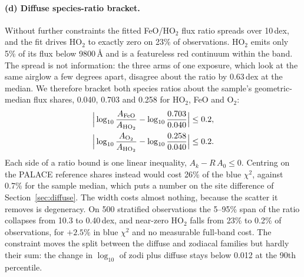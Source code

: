\paragraph{(d) Diffuse species-ratio bracket.} Without further constraints
the fitted FeO/HO$_2$ flux ratio spreads over 10\,dex, and the fit drives
HO$_2$ to exactly zero on 23\% of observations. HO$_2$ emits only 5\% of its
flux below 9800\,\AA{} and is a featureless red continuum within the band.
The spread is not information: the three arms of one exposure, which look at
the same airglow a few degrees apart, disagree about the ratio by 0.63\,dex
at the median. We therefore bracket both species ratios about the sample's
geometric-median flux shares, 0.040, 0.703 and 0.258 for HO$_2$, FeO and
O$_2$:
\begin{equation}
\begin{gathered}
  \Big|\log_{10}\frac{A_{\rm FeO}}{A_{\rm HO_2}} - \log_{10}\frac{0.703}{0.040}\Big| \le 0.2,\\
  \Big|\log_{10}\frac{A_{\rm O_2}}{A_{\rm HO_2}} - \log_{10}\frac{0.258}{0.040}\Big| \le 0.2 .
\end{gathered}
\end{equation}
Each side of a ratio bound is one linear inequality, $A_k - R\,A_0 \le 0$.
Centring on the PALACE reference shares instead would cost 26\% of the blue
$\chi^2$, against 0.7\% for the sample median, which puts a number on the
site difference of Section~\ref{sec:diffuse}. The width costs almost
nothing, because the scatter it removes is degeneracy. On 500 stratified
observations the 5--95\% span of the ratio collapses from 10.3 to 0.40\,dex,
and near-zero HO$_2$ falls from 23\% to 0.2\% of observations, for $+2.5\%$
in blue $\chi^2$ and no measurable full-band cost. The constraint moves the
split between the diffuse and zodiacal families but hardly their sum: the
change in $\log_{10}$ of zodi plus diffuse stays below 0.012 at the 90th
percentile.

